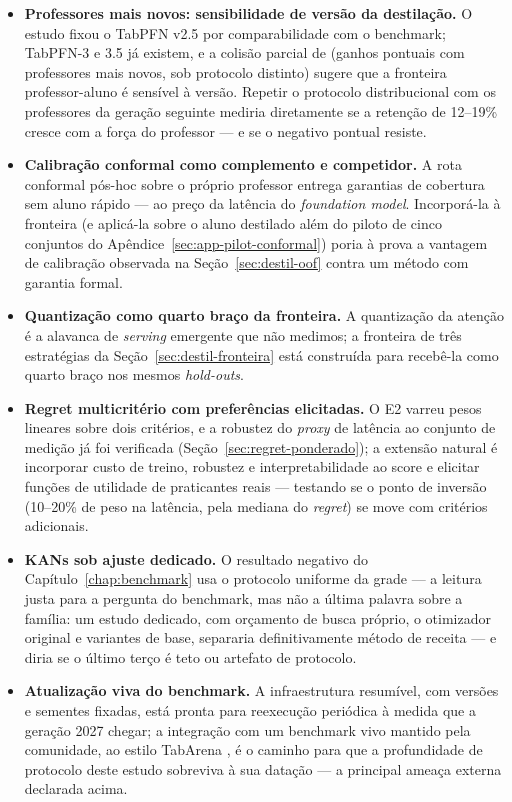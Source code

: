 \begin{itemize}
  \item \textbf{Professores mais novos: sensibilidade de versão da
    destilação.} O estudo fixou o TabPFN v2.5 por comparabilidade com o
    benchmark; TabPFN-3 \citep{tabpfn3-2026} e 3.5
    \citep{tabpfn35tr2026} já existem, e a
    colisão parcial de \citet{jeong2026} (ganhos pontuais com
    professores mais novos, sob protocolo distinto) sugere que a
    fronteira professor-aluno é sensível à versão. Repetir o protocolo
    distribucional com os professores da geração seguinte mediria
    diretamente se a retenção de 12--19\% cresce com a força do professor
    --- e se o negativo pontual resiste.
  \item \textbf{Calibração conformal como complemento e competidor.} A
    rota conformal pós-hoc sobre o próprio professor \citep{park2026}
    entrega garantias de cobertura sem aluno rápido --- ao preço da
    latência do \emph{foundation model}. Incorporá-la à fronteira (e
    aplicá-la sobre o aluno destilado além do piloto de cinco
    conjuntos do Apêndice~\ref{sec:app-pilot-conformal}) poria à
    prova a vantagem
    de calibração observada na
    Seção~\ref{sec:destil-oof} contra um método com garantia formal.
  \item \textbf{Quantização como quarto braço da fronteira.} A
    quantização da atenção \citep{kubler2026} é a alavanca de
    \emph{serving} emergente que não medimos; a fronteira de três
    estratégias da Seção~\ref{sec:destil-fronteira} está construída
    para recebê-la como quarto braço nos mesmos \emph{hold-outs}.
  \item \textbf{Regret multicritério com preferências elicitadas.} O E2
    varreu pesos lineares sobre dois critérios, e a robustez do
    \emph{proxy} de latência ao conjunto de medição já foi verificada
    (Seção~\ref{sec:regret-ponderado}); a extensão natural é incorporar
    custo de treino, robustez e interpretabilidade ao score e elicitar
    funções de utilidade de praticantes reais --- testando se o ponto de
    inversão (10--20\% de peso na latência, pela mediana do
    \emph{regret}) se move com critérios
    adicionais.
  \item \textbf{KANs sob ajuste dedicado.} O resultado negativo do
    Capítulo~\ref{chap:benchmark} usa o protocolo uniforme da grade ---
    a leitura justa para a pergunta do benchmark, mas não a última
    palavra sobre a família: um estudo dedicado, com orçamento de busca
    próprio, o otimizador original e variantes de base, separaria
    definitivamente método de receita --- e diria se o último terço é
    teto ou artefato de protocolo.
  \item \textbf{Atualização viva do benchmark.} A infraestrutura
    resumível, com versões e sementes fixadas, está pronta para
    reexecução periódica à medida que a geração 2027 chegar; a
    integração com um benchmark vivo mantido pela comunidade, ao estilo
    TabArena \citep{tabarena2025}, é o caminho para que a profundidade
    de protocolo deste estudo sobreviva à sua datação --- a principal
    ameaça externa declarada acima.
\end{itemize}


